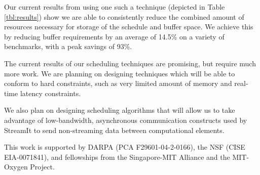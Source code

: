 Our current results from using one such a technique (depicted in 
Table \ref{tbl:results}) show we are able to consistently reduce the 
combined amount of resources necessary for storage of the schedule 
and buffer space.  We achieve this by reducing buffer requirements 
by an average of 14.5\% on a variety of benchmarks, with a peak
savings of 93\%.

The current results of our scheduling techniques are promising, but
require much more work. We are planning on designing techniques which
will be able to conform to hard constraints, such as very limited amount
of memory and real-time latency constraints.

We also plan on designing scheduling algorithms that will allow us to
take advantage of low-bandwidth, asynchronous communication constructs
used by StreamIt to send non-streaming data between computational elements.

This work is supported by DARPA (PCA F29601-04-2-0166),
the NSF (CISE EIA-0071841), and fellowships from the
Singapore-MIT Alliance and the MIT-Oxygen Project.

